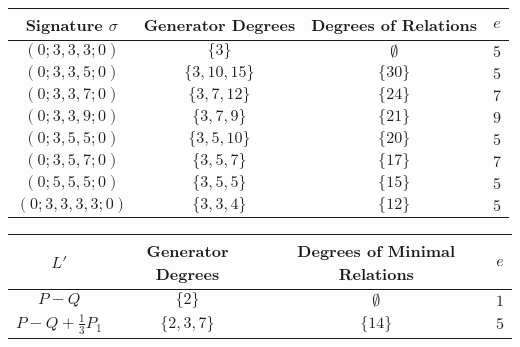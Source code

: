 \documentclass[a0,landscape, draft]{a0poster}
\newcommand{\halfcan}{L}
\theoremstyle{definition}
\begin{document}
\begin{multicols}{3}
\begin{minipage}{38cm}
\centering

\begin{tabular}
	{| c || c | c | c |}
	\hline
	Signature $\sigma$ & Generator Degrees & Degrees of Relations & $e$ \\
	\hline
	\hline

	$(0; 3, 3, 3; 0)$ & $\{3\}$ & $\emptyset$ & $5$ \\	\hline

	$(0; 3, 3, 5; 0)$ & $\{3, 10, 15\}$ & $\{30\}$ & $5$ \\	\hline
	
	$(0; 3, 3, 7; 0)$ & $\{3, 7, 12\}$ & $\{24\}$ & $7$ \\	\hline
	
	$(0; 3, 3, 9; 0)$ & $\{3, 7, 9\}$ & $\{21\}$ & $9$ \\	\hline
	
	$(0; 3, 5, 5; 0)$ & $\{3, 5, 10\}$ & $\{20\}$ & $5$ \\	\hline
	
	$(0; 3, 5, 7; 0)$ & $\{3, 5, 7\}$ & $\{17\}$ & $7$ \\	\hline
	
	$(0; 5, 5, 5; 0)$ & $\{3, 5, 5\}$ & $\{15\}$ & $5$ \\	\hline
	
	$(0; 3, 3, 3, 3; 0)$ & $\{3, 3, 4\}$ & $\{12\}$ & $5$ \\	\hline
\end{tabular}


\label{table:g-0-exceptional}
\end{minipage}


\begin{minipage}{38cm}
\centering




\begin{center}
\begin{tabular}
{| c || c | c | c |}
	\hline
	$\halfcan'$ & Generator Degrees & Degrees of Minimal Relations & $e$ \\
	\hline
	\hline
	$P - Q$ & $\{2\}$ & $\emptyset$ & $1$\\	\hline

	$P - Q + \frac{1}{3} P_1$ & $\{2, 3, 7\}$ & $\{14\}$ & $5$ \\	\hline


\end{tabular}
\end{center}
\end{minipage}
\end{multicols}
\end{document}
